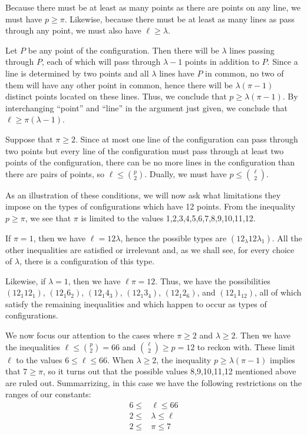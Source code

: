 \documentclass[12pt]{article}
\begin{document}
Because there must be at least as many points as there are points
on any line, we must have $p \ge \pi$.  Likewise, because there
must be at least as many lines as pass through any point, we must
also have $\ell \ge \lambda$.

Let $P$ be any point of the configuration.  Then there will be 
$\lambda$ lines passing through $P$, each of which will pass
through $\lambda - 1$ points in addition to $P$.  Since a line
is determined by two points and all $\lambda$ lines have $P$ in
common, no two of them will have any other point in common, hence
there will be $\lambda (\pi - 1)$ distinct points located on these
lines.  Thus, we conclude that $p \ge \lambda (\pi - 1)$.  By
interchanging ``point'' and ``line'' in the argument just given,
we conclude that $\ell \ge \pi (\lambda - 1)$.

Suppose that $\pi \ge 2$.  Since at most one line of the configuration
can pass through two points but every line of the configuration must
pass through at least two points of the configuration, there can be no 
more lines in the configuration than there are pairs of points, so 
$\ell \le {p \choose 2}$.  Dually, we must have $p \le {\ell \choose 2}$.

As an illustration of these conditions, we will now ask what limitations
they impose on the types of configurations which have 12 points.  From
the inequality $p \ge \pi$, we see that $\pi$ is limited to the values 
1,2,3,4,5,6,7,8,9,10,11,12.

If $\pi = 1$, then we have $\ell = 12 \lambda$, hence the possible types
are $( 12_\lambda  12 \lambda_1 )$.  All the other inequalities are 
satisfied or irrelevant and, as we shall see, for every choice of $\lambda$,
there is a configuration of this type.

Likewise, if $\lambda = 1$, then we have $\ell \pi = 12$.  Thus, we have
the possibilities $(12_1 12_1)$, $(12_1 6_2)$, $(12_1 4_3)$, $(12_1 3_4)$,
$(12_1 2_6)$, and $(12_1 1_12)$, all of which satisfy the remaining 
inequalities and which happen to occur as types of configurations.

We now focus our attention to the cases where $\pi \ge 2$ and $\lambda \ge 2$.
Then we have the inequalities $\ell \le {p \choose 2} = 66$ and 
${\ell \choose 2} \ge p = 12$ to reckon with.  These limit $\ell$ to the 
values $6 \le \ell \le 66$.  When $\lambda \ge 2$, the inequality 
$p \ge \lambda (\pi - 1)$ implies that $7 \ge \pi$, so it turns out that
the possible values 8,9,10,11,12 mentioned above are ruled out.
Summarrizing, in this case we have the following restrictions on the ranges of
our constants:
\begin{align*}
 6 \le &\ell \le 66 \\
 2 \le &\lambda \le \ell \\ 
 2 \le &\pi \le 7
\end{align*}
\end{document}
